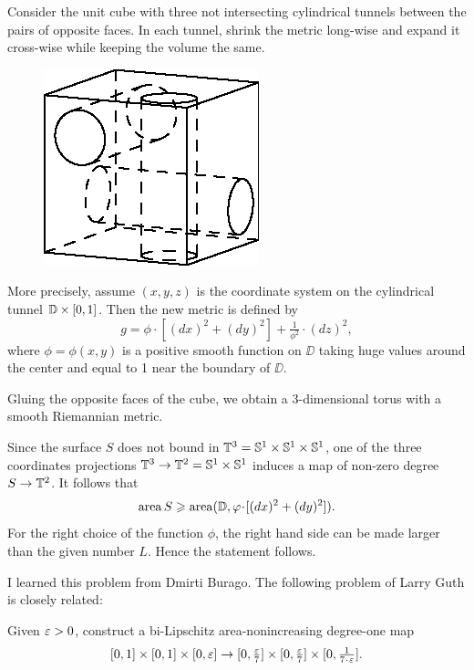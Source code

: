 Consider the unit cube with three not intersecting cylindrical tunnels  
between the pairs of opposite faces.
In each tunnel, shrink the metric long-wise and expand it  cross-wise while keeping the volume the same.

\medskip

\begin{figure}
\vskip-4mm
\centering
\includegraphics{asy/cube}
\end{figure}

More precisely, assume $(x,y,z)$ is the coordinate system on the cylindrical tunnel $\DD\z\times [0,1]$. 
Then the new metric is defined by
\[g=\phi\cdot [(dx)^2+ (dy)^2]+\tfrac1{\phi^2}\cdot (dz)^2,\]
where $\phi=\phi(x,y)$ is a positive smooth function on $\DD$ taking huge values around the center and equal to 1 near the boundary of $\DD$.


Gluing the opposite faces of the cube, we obtain a 3-dimensional torus with a smooth Riemannian metric.

Since the surface $S$ does not bound in $\mathbb{T}^3=\mathbb{S}^1\times\mathbb{S}^1\times\mathbb{S}^1$,
one of the three coordinates projections $\mathbb{T}^3\to\mathbb{T}^2=\mathbb{S}^1\times\mathbb{S}^1$
induces a map of non-zero degree $S\to\mathbb{T}^2$.
It follows that 
\[\area S\ge  \area(\DD,\phi\cdot [(dx)^2+ (dy)^2]).\]
For the right choice of the function $\phi$, the right hand side can be made larger than the given number $L$.
Hence the statement follows.
\qeds

I learned this problem from Dmirti Burago.
The following problem of Larry Guth \cite{guth} is closely related:

\begin{pr}
Given $\varepsilon>0$, construct a bi-Lipschitz area-nonincreasing degree-one map 
\[[0,1]\times[0,1]\times [0,\eps]\to [0,\tfrac\eps7]\times [0,\tfrac\eps7]\times [0,\tfrac1{7\cdot\eps}].\]

\end{pr}


